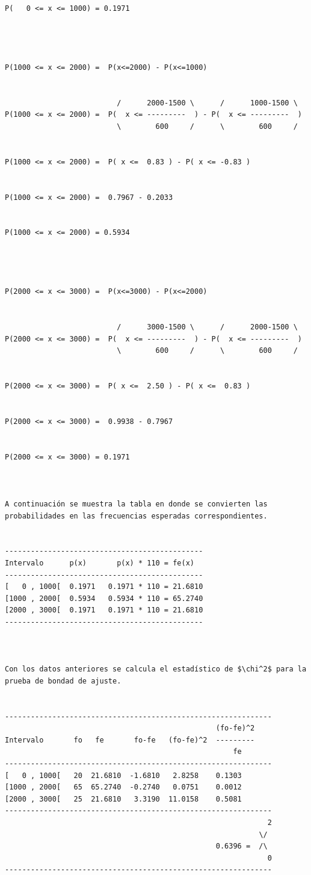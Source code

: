 \begin{verbatim}
P(   0 <= x <= 1000) = 0.1971




P(1000 <= x <= 2000) =  P(x<=2000) - P(x<=1000)


                          /      2000-1500 \      /      1000-1500 \
P(1000 <= x <= 2000) =  P(  x <= ---------  ) - P(  x <= ---------  )
                          \        600     /      \        600     /


P(1000 <= x <= 2000) =  P( x <=  0.83 ) - P( x <= -0.83 )


P(1000 <= x <= 2000) =  0.7967 - 0.2033


P(1000 <= x <= 2000) = 0.5934




P(2000 <= x <= 3000) =  P(x<=3000) - P(x<=2000)


                          /      3000-1500 \      /      2000-1500 \ 
P(2000 <= x <= 3000) =  P(  x <= ---------  ) - P(  x <= ---------  )
                          \        600     /      \        600     / 


P(2000 <= x <= 3000) =  P( x <=  2.50 ) - P( x <=  0.83 )


P(2000 <= x <= 3000) =  0.9938 - 0.7967


P(2000 <= x <= 3000) = 0.1971



A continuación se muestra la tabla en donde se convierten las probabilidades en las frecuencias esperadas correspondientes.


----------------------------------------------
Intervalo      p(x)       p(x) * 110 = fe(x)
----------------------------------------------
[   0 , 1000[  0.1971   0.1971 * 110 = 21.6810
[1000 , 2000[  0.5934   0.5934 * 110 = 65.2740
[2000 , 3000[  0.1971   0.1971 * 110 = 21.6810
----------------------------------------------



Con los datos anteriores se calcula el estadístico de $\chi^2$ para la prueba de bondad de ajuste.


--------------------------------------------------------------
                                                 (fo-fe)^2
Intervalo       fo   fe       fo-fe   (fo-fe)^2  ---------
                                                     fe
--------------------------------------------------------------
[   0 , 1000[   20  21.6810  -1.6810   2.8258    0.1303
[1000 , 2000[   65  65.2740  -0.2740   0.0751    0.0012
[2000 , 3000[   25  21.6810   3.3190  11.0158    0.5081
--------------------------------------------------------------
                                                             2
                                                           \/
                                                 0.6396 =  /\
                                                             0
--------------------------------------------------------------



\end{verbatim}
